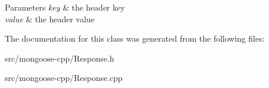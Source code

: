 \begin{DoxyParams}{Parameters}
{\em key} & the header key\\
\hline
{\em value} & the header value \\
\hline
\end{DoxyParams}


The documentation for this class was generated from the following files\+:\begin{DoxyCompactItemize}
\item 
src/mongoose-\/cpp/Response.\+h\item 
src/mongoose-\/cpp/Response.\+cpp\end{DoxyCompactItemize}

